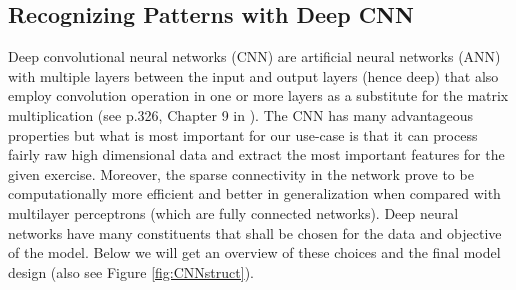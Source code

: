 \documentclass[11pt, a4paper]{article}
\begin{document}
\subsection{Recognizing Patterns with Deep CNN}
\label{subsec:DM:RecPatwCNN}
Deep convolutional neural networks (CNN) are artificial neural networks (ANN) with multiple layers between the input and output layers (hence deep) that also employ convolution operation in one or more layers as a substitute for the matrix multiplication (see p.326, Chapter 9 in \cite{goodfellow2016deep}). 
The CNN has many advantageous properties but what is most important for our use-case is that it can process fairly raw high dimensional data and extract the most important features for the given exercise. Moreover, the sparse connectivity in the network prove to be computationally more efficient and better in generalization when compared with multilayer perceptrons (which are fully connected networks). Deep neural networks have many constituents that shall be chosen for the data and objective of the model. Below we will get an overview of these choices and the final model design (also see Figure \ref{fig:CNNstruct}).
\end{document}
